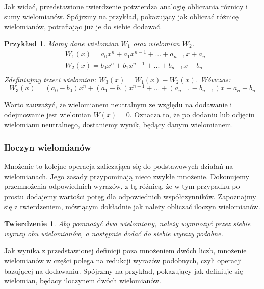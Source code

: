 \documentclass[twoside,a4paper]{book}
\newtheorem{theorem}{Twierdzenie}
\newtheorem{example}{Przykład}
\begin{document}
Jak widać, przedstawione twierdzenie potwierdza analogię obliczania róznicy i sumy wielomianów. Spójrzmy na przykład, pokazujący jak obliczać różnicę wielomianów, potrafiając już je do siebie dodawać.

\begin{example}
	Mamy dane wielomian $W_1$ oraz wielomian $W_2$.
	\begin{equation}
	\begin{split}
	&W_1(x) = a_0x^n + a_1x^{n-1} + ... + a_{n-1}x + a_n \\
	&W_2(x) = b_0x^n + b_1x^{n-1} + ... + b_{n-1}x + b_n \\
	\end{split}
	\end{equation}
	Zdefiniujmy trzeci wielomian: $W_3(x) = W_1(x) - W_2(x)$. Wówczas:
	\begin{equation}
		W_3(x) = (a_0-b_0)x^n + (a_1-b_1)x^{n-1} + ... + (a_{n-1} - b_{n-1})x + a_n - b_n
	\end{equation}
\end{example}

Warto zauważyć, że wielomianem neutralnym ze względu na dodawanie i odejmowanie jest wielomian $W(x)=0$. Oznacza to, że po dodaniu lub odjęciu wielomianu neutralnego, dostaniemy wynik, będący danym wielomianem.

\subsubsection{Iloczyn wielomianów}

Mnożenie to kolejne operacja zaliczająca się do podstawowych działań na wielomianach. Jego zasady przypominają nieco zwykłe mnożenie. Dokonujemy przemnożenia odpowiednich wyrazów, z tą różnicą, że w tym przypadku po prostu dodajemy wartości potęg dla odpowiednich współczynników. Zapoznajmy się z twierdzeniem, mówiącym dokładnie jak należy obliczać iloczyn wielomianów.

\begin{theorem}
	Aby pomnożyć dwa wielomiany, należy wymnożyć przez siebie wyrazy obu wielomianów, a następnie dodać do siebie wyrazy podobne.
\end{theorem}

Jak wynika z przedstawionej definicji poza mnożeniem dwóch liczb, mnożenie wielomianów w części polega na redukcji wyrazów podobnych, czyli operacji bazującej na dodawaniu. Spójrzmy na przykład, pokazujący jak definiuje się wielomian, będacy iloczynem dwóch wielomianów.
\end{document}
